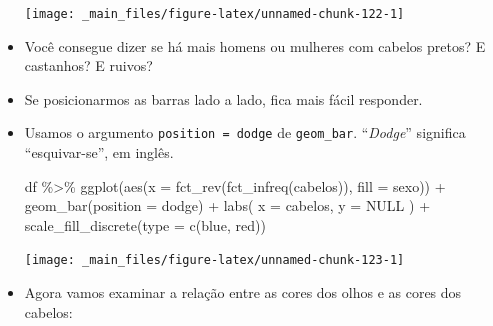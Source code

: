 \documentclass[
  11pt]{report}
\newenvironment{Shaded}{\begin{snugshade}}{\end{snugshade}}
\newcommand{\AttributeTok}[1]{\textcolor[rgb]{0.77,0.63,0.00}{#1}}
\newcommand{\ConstantTok}[1]{\textcolor[rgb]{0.00,0.00,0.00}{#1}}
\newcommand{\FunctionTok}[1]{\textcolor[rgb]{0.00,0.00,0.00}{#1}}
\newcommand{\NormalTok}[1]{#1}
\newcommand{\SpecialCharTok}[1]{\textcolor[rgb]{0.00,0.00,0.00}{#1}}
\newcommand{\StringTok}[1]{\textcolor[rgb]{0.31,0.60,0.02}{#1}}
\renewenvironment{Shaded}{
    \begin{mdframed}[%
      roundcorner=2pt,%
      innerleftmargin=5pt,%
      innerrightmargin=5pt,%
      topline=true,%
      leftline=true,%
      rightline=true,%
      bottomline=true,%
      linewidth=0.5pt,%
      linecolor=black!20,%
      backgroundcolor=black!2,%
      skipabove=2ex,%
      skipbelow=2.5ex%
    ]%
  }
  {
    \end{mdframed}
  }
\begin{document}
\begin{itemize}
  \begin{center}\texttt{[image: \_main\_files/figure-latex/unnamed-chunk-122-1]} \end{center}
\item
  Você consegue dizer se há mais homens ou mulheres com cabelos pretos? E castanhos? E ruivos?
\item
  Se posicionarmos as barras lado a lado, fica mais fácil responder.
\item
  Usamos o argumento \texttt{position\ =\ \textquotesingle{}dodge\textquotesingle{}} de \texttt{geom\_bar}. ``\emph{Dodge}'' significa ``esquivar-se'', em inglês.

\begin{Shaded}
\begin{Highlighting}[]
\NormalTok{df }\SpecialCharTok{\%\textgreater{}\%} 
  \FunctionTok{ggplot}\NormalTok{(}\FunctionTok{aes}\NormalTok{(}\AttributeTok{x =} \FunctionTok{fct\_rev}\NormalTok{(}\FunctionTok{fct\_infreq}\NormalTok{(cabelos)), }\AttributeTok{fill =}\NormalTok{ sexo)) }\SpecialCharTok{+}
    \FunctionTok{geom\_bar}\NormalTok{(}\AttributeTok{position =} \StringTok{\textquotesingle{}dodge\textquotesingle{}}\NormalTok{) }\SpecialCharTok{+}
    \FunctionTok{labs}\NormalTok{(}
      \AttributeTok{x =} \StringTok{\textquotesingle{}cabelos\textquotesingle{}}\NormalTok{,}
      \AttributeTok{y =} \ConstantTok{NULL}
\NormalTok{    ) }\SpecialCharTok{+}
    \FunctionTok{scale\_fill\_discrete}\NormalTok{(}\AttributeTok{type =} \FunctionTok{c}\NormalTok{(}\StringTok{\textquotesingle{}blue\textquotesingle{}}\NormalTok{, }\StringTok{\textquotesingle{}red\textquotesingle{}}\NormalTok{))}
\end{Highlighting}
\end{Shaded}

  \begin{center}\texttt{[image: \_main\_files/figure-latex/unnamed-chunk-123-1]} \end{center}
\item
  Agora vamos examinar a relação entre as cores dos olhos e as cores dos cabelos:


\end{itemize}
\end{document}
